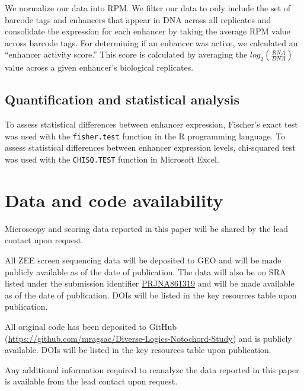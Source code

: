 We normalize our data into RPM.  We filter our data to only include the set of barcode tags and enhancers that appear in DNA across all replicates and consolidate the expression for each enhancer by taking the average RPM value across barcode tags. For determining if an enhancer was active, we calculated an “enhancer activity score.” This score is calculated by averaging the $log_2({\frac{RNA}{DNA}})$ value across a given enhancer’s biological replicates. 

\subsection{Quantification and statistical analysis}

To assess statistical differences between enhancer expression, Fischer’s exact test was used with the \verb|fisher.test| function in the R programming language. To assess statistical differences between enhancer expression levels, chi-squared test was used with the \verb|CHISQ.TEST| function in Microsoft Excel.

\section{Data and code availability}

Microscopy and scoring data reported in this paper will be shared by the lead contact upon request.

All ZEE screen sequencing data will be deposited to GEO and will be made publicly available as of the date of publication. The data will also be on SRA listed under the submission identifier \href{https://www.ncbi.nlm.nih.gov/sra/PRJNA861319}{PRJNA861319} and will be made available as of the date of publication. DOIs will be listed in the key resources table upon publication. 

All original code has been deposited to GitHub (\href{https://github.com/mragsac/Diverse-Logics-Notochord-Study}{https://github.com/mragsac/Diverse-Logics-Notochord-Study}) and is publicly available. DOIs will be listed in the key resources table upon publication. 

Any additional information required to reanalyze the data reported in this paper is available from the lead contact upon request. 

